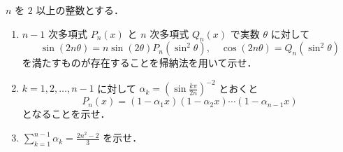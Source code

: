 \documentclass[a4paper,10pt]{ltjsarticle}
\begin{document}
\begin{oframed}
$n$ を $2$ 以上の整数とする．
\begin{enumerate}
  \item $n-1$ 次多項式 $P_n(x)$ と $n$ 次多項式 $Q_n(x)$ で実数 $\theta$ に対して
\[ \sin(2n\theta) = n \sin(2\theta) P_n(\sin^2\theta), \quad \cos(2n\theta) = Q_n(\sin^2\theta) \]
を満たすものが存在することを帰納法を用いて示せ．
  \item $k=1, 2, \dots, n-1$ に対して $\alpha_k = \left(\sin\frac{k\pi}{2n}\right)^{-2}$ とおくと
\[ P_n(x) = (1-\alpha_1 x)(1-\alpha_2 x)\cdots(1-\alpha_{n-1} x) \]
となることを示せ．
  \item $\displaystyle \sum_{k=1}^{n-1} \alpha_k = \frac{2n^2-2}{3}$ を示せ．
\end{enumerate}
\end{oframed}
\setlength{\columnseprule}{0.4pt}
\end{document}
